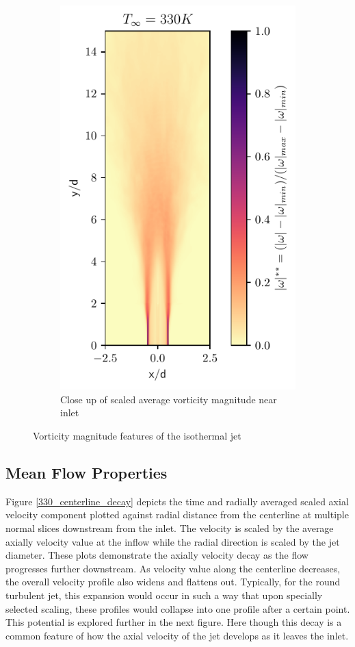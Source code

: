 \begin{figure}[htbp!]
\begin{subfigure}{0.25\textwidth}
	\includegraphics[scale=.65]{figures/Plots/vertical/330/magvort_scaled_vert_avg_330_zoom.pdf}
	\caption{Close up of scaled average vorticity magnitude near inlet} \label{330_magvort_4}
\end{subfigure}
\caption{Vorticity magnitude features of the isothermal jet}
\label{330_magvort_features}
\end{figure}

\subsection{Mean Flow Properties}
Figure \ref{330_centerline_decay} depicts the time and radially averaged scaled axial velocity component plotted against radial distance from the centerline at multiple normal slices downstream from the inlet. The velocity is scaled by the average axially velocity value at the inflow while the radial direction is scaled by the jet diameter. These plots demonstrate the axially velocity decay as the flow progresses further downstream. As velocity value along the centerline decreases, the overall velocity profile also widens and flattens out. Typically, for the round turbulent jet, this expansion would occur in such a way that upon specially selected scaling, these profiles would collapse into one profile after a certain point. This potential is explored further in the next figure. Here though this decay is a common feature of how the axial velocity of the jet develops as it leaves the inlet. 

